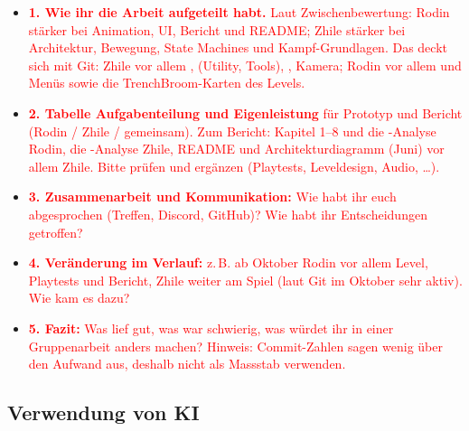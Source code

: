 \documentclass[../Main.tex]{subfiles}
\begin{document}
\begin{itemize}[leftmargin=1.5cm]
    \item \textcolor{red}{\textbf{1. Wie ihr die Arbeit aufgeteilt habt.} Laut Zwischenbewertung: Rodin stärker bei Animation, UI, Bericht und README; Zhile stärker bei Architektur, Bewegung, State Machines und Kampf-Grundlagen. Das deckt sich mit Git: Zhile vor allem ,  (Utility, Tools), , Kamera; Rodin vor allem  und Menüs sowie die TrenchBroom-Karten des Levels.}
    \item \textcolor{red}{\textbf{2. Tabelle Aufgabenteilung und Eigenleistung} für Prototyp und Bericht (Rodin / Zhile / gemeinsam). Zum Bericht: Kapitel 1--8 und die -Analyse Rodin, die -Analyse Zhile, README und Architekturdiagramm (Juni) vor allem Zhile. Bitte prüfen und ergänzen (Playtests, Leveldesign, Audio, \ldots).}
    \item \textcolor{red}{\textbf{3. Zusammenarbeit und Kommunikation:} Wie habt ihr euch abgesprochen (Treffen, Discord, GitHub)? Wie habt ihr Entscheidungen getroffen?}
    \item \textcolor{red}{\textbf{4. Veränderung im Verlauf:} z.\,B. ab Oktober Rodin vor allem Level, Playtests und Bericht, Zhile weiter am Spiel (laut Git im Oktober sehr aktiv). Wie kam es dazu?}
    \item \textcolor{red}{\textbf{5. Fazit:} Was lief gut, was war schwierig, was würdet ihr in einer Gruppenarbeit anders machen? Hinweis: Commit-Zahlen sagen wenig über den Aufwand aus, deshalb nicht als Massstab verwenden.}
\end{itemize}

\subsection{Verwendung von KI} \label{sec:ReflexionKI}
\end{document}
